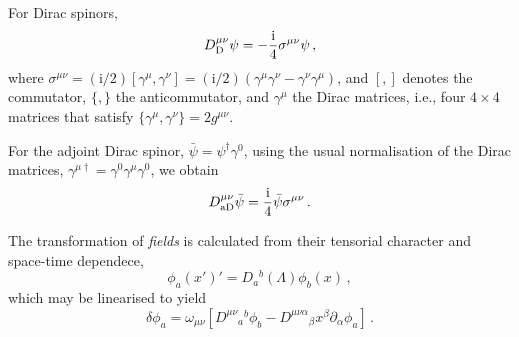 \documentclass[a4paper,12pt]{article}
\def\imagi{\mathrm{i}}
\begin{document}
For Dirac spinors,
\begin{equation}\label{eq:DiracRep}
 D^{\mu\nu}_{\rm D}\psi = -\frac{\imagi}{4} \sigma^{\mu\nu}\psi\,,
\end{equation}
where $\sigma^{\mu\nu}=(\imagi/2)[\gamma^\mu,\gamma^\nu]=(\imagi/2)(\gamma^\mu\gamma^\nu-\gamma^\nu\gamma^\mu)$, and $[,]$ denotes the commutator, $\{,\}$ the anticommutator, and $\gamma^{\mu}$ the Dirac matrices, i.e., four $4\times 4$ matrices that satisfy $\{\gamma^\mu,\gamma^\nu\}=2g^{\mu\nu}$.

For the adjoint Dirac spinor, $\bar{\psi}=\psi^\dagger \gamma^0$, using the usual normalisation of the Dirac matrices, $\gamma^{\mu\dagger}=\gamma^0 \gamma^\mu \gamma^0$, we obtain
\begin{equation}\label{eq:AdjDiracRep}
 D^{\mu\nu}_{\rm aD} \bar{\psi} = \frac{\imagi}{4}\bar{\psi} \sigma^{\mu\nu}\,.
\end{equation}


The transformation of \emph{fields} is calculated from their tensorial character and space-time dependece,
\begin{equation}\label{eq:fieldtrf}
 \phi_a(x') ' = D_a{}^b(\Lambda) \phi_b(x)\,,
\end{equation}
which may be linearised to yield
\begin{equation}\label{eq:InfFieldtrf}
 \delta \phi_a = \omega_{\mu\nu}\left[ D^{\mu\nu}{}_a{}^b \phi_b - D^{\mu\nu\alpha}{}_{\beta}x^\beta \partial_\alpha \phi_a \right]\,.
\end{equation}
\end{document}
